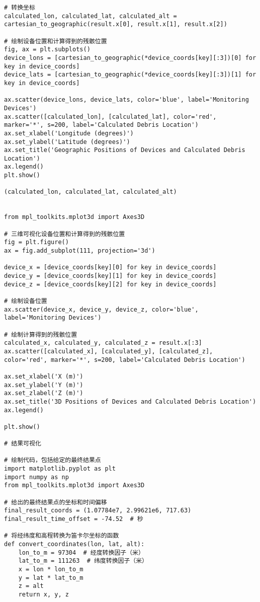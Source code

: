 \documentclass[withoutpreface,bwprint,12pt,a4paper]{cumcmthesis}
\begin{document}
\begin{appendices}
\begin{lstlisting}
# 转换坐标
calculated_lon, calculated_lat, calculated_alt = cartesian_to_geographic(result.x[0], result.x[1], result.x[2])

# 绘制设备位置和计算得到的残骸位置
fig, ax = plt.subplots()
device_lons = [cartesian_to_geographic(*device_coords[key][:3])[0] for key in device_coords]
device_lats = [cartesian_to_geographic(*device_coords[key][:3])[1] for key in device_coords]

ax.scatter(device_lons, device_lats, color='blue', label='Monitoring Devices')
ax.scatter([calculated_lon], [calculated_lat], color='red', marker='*', s=200, label='Calculated Debris Location')
ax.set_xlabel('Longitude (degrees)')
ax.set_ylabel('Latitude (degrees)')
ax.set_title('Geographic Positions of Devices and Calculated Debris Location')
ax.legend()
plt.show()

(calculated_lon, calculated_lat, calculated_alt)


from mpl_toolkits.mplot3d import Axes3D

# 三维可视化设备位置和计算得到的残骸位置
fig = plt.figure()
ax = fig.add_subplot(111, projection='3d')

device_x = [device_coords[key][0] for key in device_coords]
device_y = [device_coords[key][1] for key in device_coords]
device_z = [device_coords[key][2] for key in device_coords]

# 绘制设备位置
ax.scatter(device_x, device_y, device_z, color='blue', label='Monitoring Devices')

# 绘制计算得到的残骸位置
calculated_x, calculated_y, calculated_z = result.x[:3]
ax.scatter([calculated_x], [calculated_y], [calculated_z], color='red', marker='*', s=200, label='Calculated Debris Location')

ax.set_xlabel('X (m)')
ax.set_ylabel('Y (m)')
ax.set_zlabel('Z (m)')
ax.set_title('3D Positions of Devices and Calculated Debris Location')
ax.legend()

plt.show()

# 结果可视化

# 绘制代码，包括给定的最终结果点
import matplotlib.pyplot as plt
import numpy as np
from mpl_toolkits.mplot3d import Axes3D

# 给出的最终结果点的坐标和时间偏移
final_result_coords = (1.07784e7, 2.99621e6, 717.63)
final_result_time_offset = -74.52  # 秒

# 将经纬度和高程转换为笛卡尔坐标的函数
def convert_coordinates(lon, lat, alt):
    lon_to_m = 97304  # 经度转换因子（米）
    lat_to_m = 111263  # 纬度转换因子（米）
    x = lon * lon_to_m
    y = lat * lat_to_m
    z = alt
    return x, y, z


\end{lstlisting}
\end{appendices}
\end{document}
